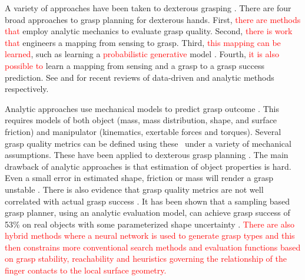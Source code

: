 A variety of approaches have been taken to dexterous grasping \cite{bicchi2000a,miller2004,ciocarlie2009hand,detry2010a,varley2015generating,kopicki2015ijrr,Hua2016,Alo2016,Kanoulas2017,Cao2021}. There are four broad approaches to grasp planning for dexterous hands. First, \textcolor{red}{there are methods that} employ analytic mechanics to evaluate grasp quality. Second, \textcolor{red}{there is work that} engineers a mapping from sensing to grasp. Third, \textcolor{red}{this mapping can be learned}, such as learning a \textcolor{red}{probabilistic generative} model \cite{bishop_pattern_2006}. Fourth, \textcolor{red}{it is also possible to} learn a mapping from sensing and a grasp to a grasp success prediction. See \cite{bohg2014data} and  \cite{sahbani2012overview} for recent reviews of data-driven and analytic methods respectively.

Analytic approaches use mechanical models to predict grasp outcome \cite{bicchi2000a,Liu2000,Pollard2004,miller2004}. This requires models of both object (mass, mass distribution, shape, and surface friction) and manipulator (kinematics, exertable forces and torques). Several grasp quality metrics can be defined using these~\cite{Ferrari1992,Roa2015,Shimoga1996} under a variety of mechanical assumptions. These have been applied to dexterous grasp planning \cite{Boutselis2014,Gori2014,Hang2014,Rosales2012,Saut2012,ciocarlie2009hand}. The main drawback of analytic approaches is that estimation of object properties is hard. Even a small error in estimated shape, friction or mass will render a grasp unstable \cite{zheng2005a}. There is also evidence that grasp quality metrics are not well correlated with actual grasp success \cite{bekiroglu2011b,kim2013a,goins2014a}. It has been shown that a sampling based grasp planner, using an analytic evaluation model, can achieve grasp success of 53\% on real objects with some parameterized shape uncertainty \cite{li2016dexterous}. \textcolor{red}{There are also hybrid methods \cite{Deng2021} where a neural network is used to generate grasp types and this then constrains more conventional search methods and evaluation functions based on grasp stability, reachability and heuristics governing the relationship of the finger contacts to the local surface geometry.} 

